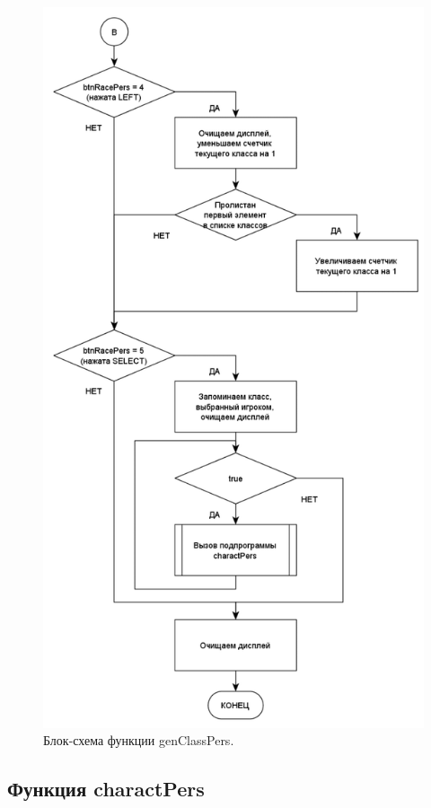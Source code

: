 \begin{figure}[H]
    \centering
    \includegraphics[scale=0.8]{genClassPers2.png}
    \caption{Блок-схема функции genClassPers.}
    \label{fig:class2}
\end{figure}

\subsection*{Функция charactPers}


